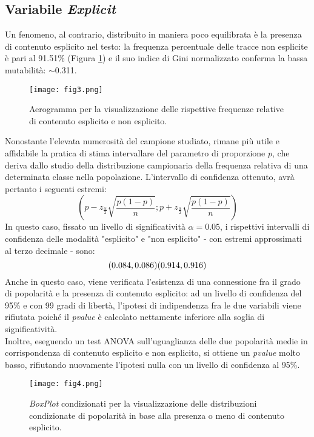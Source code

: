 \documentclass[fleqn,10pt]{SelfArx} %
\begin{document}
\subsection*{Variabile \textit{Explicit}}
Un fenomeno, al contrario, distribuito in maniera poco equilibrata è la presenza di contenuto esplicito nel testo: la frequenza percentuale delle tracce non esplicite è pari al 91.51\% (Figura \ref{fig:fig3}) e il suo indice di Gini normalizzato conferma la bassa mutabilità: $\sim$0.311. 
\begin{figure}[H]
    \centering
    \texttt{[image: fig3.png]}
    \label{fig:fig3}
    \caption{Aerogramma per la visualizzazione delle rispettive frequenze relative di contenuto esplicito e non esplicito.}
\end{figure}
Nonostante l'elevata numerosità del campione studiato, rimane più utile e affidabile la pratica di stima intervallare del parametro di proporzione $p$, che deriva dallo studio della distribuzione campionaria della frequenza relativa di una determinata classe nella popolazione. L'intervallo di confidenza ottenuto, avrà pertanto i seguenti estremi:
\begin{equation}
    (p-z_{\frac{\alpha}{2}}\sqrt{\frac{p(1-p)}{n}};p+z_{\frac{\alpha}{2}}\sqrt{\frac{p(1-p)}{n}})
\end{equation}
In questo caso, fissato un livello di significatività $\alpha=0.05$, i rispettivi intervalli di confidenza delle modalità "esplicito" e "non esplicito" - con estremi approssimati al terzo decimale - sono:
\begin{equation}
    (0.084, 0.086)\\(0.914, 0.916)
\end{equation}
Anche in questo caso, viene verificata l'esistenza di una connessione fra il grado di popolarità e la presenza di contenuto esplicito: ad un livello di confidenza del 95\% e con 99 gradi di libertà, l'ipotesi di indipendenza fra le due variabili viene rifiutata poiché il \textit{pvalue} è calcolato nettamente inferiore alla soglia di significatività.\\
Inoltre, eseguendo un test ANOVA sull'uguaglianza delle due popolarità medie in corrispondenza di contenuto esplicito e non esplicito, si ottiene un \textit{pvalue} molto basso, rifiutando nuovamente l'ipotesi nulla con un livello di confidenza al 95\%.
\begin{figure}[H]
    \centering
    \texttt{[image: fig4.png]}
    \label{fig:fig4}
    \caption{\textit{BoxPlot} condizionati per la visualizzazione delle distribuzioni condizionate di popolarità in base alla presenza o meno di contenuto esplicito.}
\end{figure}
\end{document}
